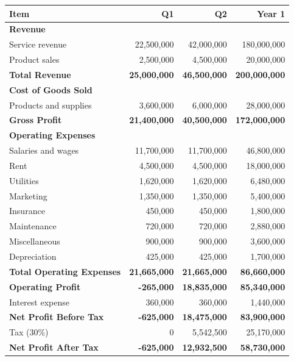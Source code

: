 \begin{tabular}{|l|r|r|r|}
\hline
\textbf{Item} & \textbf{Q1} & \textbf{Q2} & \textbf{Year 1} \\
\hline
\multicolumn{4}{|l|}{\textbf{Revenue}} \\
Service revenue & 22,500,000 & 42,000,000 & 180,000,000 \\
Product sales & 2,500,000 & 4,500,000 & 20,000,000 \\
\hline
\textbf{Total Revenue} & \textbf{25,000,000} & \textbf{46,500,000} & \textbf{200,000,000} \\
\hline
\multicolumn{4}{|l|}{\textbf{Cost of Goods Sold}} \\
Products and supplies & 3,600,000 & 6,000,000 & 28,000,000 \\
\hline
\textbf{Gross Profit} & \textbf{21,400,000} & \textbf{40,500,000} & \textbf{172,000,000} \\
\hline
\multicolumn{4}{|l|}{\textbf{Operating Expenses}} \\
Salaries and wages & 11,700,000 & 11,700,000 & 46,800,000 \\
Rent & 4,500,000 & 4,500,000 & 18,000,000 \\
Utilities & 1,620,000 & 1,620,000 & 6,480,000 \\
Marketing & 1,350,000 & 1,350,000 & 5,400,000 \\
Insurance & 450,000 & 450,000 & 1,800,000 \\
Maintenance & 720,000 & 720,000 & 2,880,000 \\
Miscellaneous & 900,000 & 900,000 & 3,600,000 \\
Depreciation & 425,000 & 425,000 & 1,700,000 \\
\hline
\textbf{Total Operating Expenses} & \textbf{21,665,000} & \textbf{21,665,000} & \textbf{86,660,000} \\
\hline
\textbf{Operating Profit} & \textbf{-265,000} & \textbf{18,835,000} & \textbf{85,340,000} \\
\hline
Interest expense & 360,000 & 360,000 & 1,440,000 \\
\hline
\textbf{Net Profit Before Tax} & \textbf{-625,000} & \textbf{18,475,000} & \textbf{83,900,000} \\
\hline
Tax (30\%) & 0 & 5,542,500 & 25,170,000 \\
\hline
\textbf{Net Profit After Tax} & \textbf{-625,000} & \textbf{12,932,500} & \textbf{58,730,000} \\
\hline
\end{tabular}

